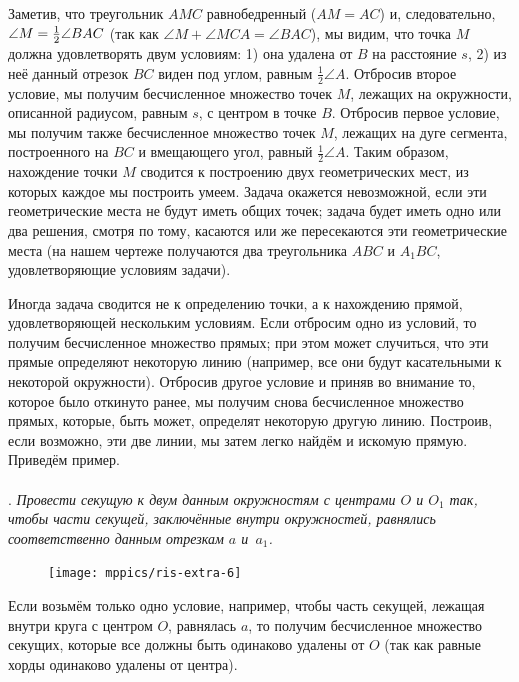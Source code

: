 \documentclass[twoside]{book}
\begin{document}
Заметив, что треугольник $AMC$ равнобедренный ($AM=AC$) и, следовательно, $\angle M \z=  \tfrac12\angle BAC$ (так как $\angle M+\angle MCA = \angle BAC$), мы видим, что точка $M$ должна удовлетворять двум условиям:
1) она удалена от $B$ на расстояние $s$, 
2) из неё данный отрезок $BC$ виден под углом, равным $\tfrac12\angle A$.
Отбросив второе условие, мы получим бесчисленное множество точек $M$, лежащих на окружности, описанной радиусом, равным $s$, с центром в точке $B$.
Отбросив первое условие, мы получим также бесчисленное множество точек $M$, лежащих на дуге сегмента, построенного на $BC$ и вмещающего угол, равный $\tfrac12\angle A$.
Таким образом, нахождение точки $M$ сводится к построению двух геометрических мест, из которых каждое мы построить умеем.
Задача окажется невозможной, если эти геометрические места не будут иметь общих точек;
задача будет иметь одно или два решения, смотря по тому, касаются или же пересекаются эти геометрические места (на нашем чертеже получаются два треугольника $ABC$ и $A_1BC$, удовлетворяющие условиям задачи).

\medskip

Иногда задача сводится не к определению точки, а к нахождению прямой, удовлетворяющей нескольким условиям.
Если отбросим одно из условий, то получим бесчисленное множество прямых;
при этом может случиться, что эти прямые определяют некоторую линию (например, все они будут касательными к некоторой окружности).
Отбросив другое условие и приняв во внимание то, которое было откинуто ранее, мы получим снова бесчисленное множество прямых, которые, быть может, определят некоторую другую линию.
Построив, если возможно, эти две линии, мы затем легко найдём и искомую прямую.
Приведём пример.

\paragraph{}\label{1938/135}
.
\emph{Провести секущую к двум данным окружностям с центрами $O$ и $O_1$ так, чтобы части секущей, заключённые внутри окружностей, равнялись соответственно данным отрезкам $a$ и~$a_1$.}


\begin{figure}
\centering
\texttt{[image: mppics/ris-extra-6]}
\caption{}\label{extra/ris-6}
\end{figure}

Если возьмём только одно условие, например, чтобы часть секущей, лежащая внутри круга  с центром $O$, равнялась $a$, то получим бесчисленное множество секущих, которые все должны быть одинаково удалены от $O$ (так как равные хорды одинаково удалены от центра).
\end{document}
